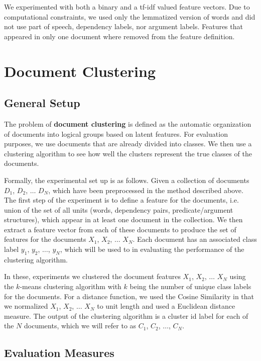 \documentclass[11pt]{article}
\newcommand{\bt}[1]{\textbf{#1}}
\begin{document}
We experimented with both a binary and a tf-idf valued feature vectors. Due to computational constraints, we used only the lemmatized version of words and did not use part of speech, dependency labels, nor argument labels. Features that appeared in only one document where removed from the feature definition.


\section{Document Clustering} \label{sec:DocumentClusterting}

\subsection{General Setup}

The problem of \bt{document clustering} is defined as the automatic organization of documents into logical groups based on latent features. For evaluation purposes, we use documents that are already divided into classes. We then use a clustering algorithm to see how well the clusters represent the true classes of the documents. 

Formally, the experimental set up is as follows. Given a collection of documents $D_1$, $D_2$, $\dots$ $D_N$,  which have been preprocessed in the method described above. The first step of the experiment is to define a feature for the documents, i.e. union of the set of all units (words, dependency pairs, predicate/argument structures), which appear in at least one document in the collection. We then extract a feature vector from each of these documents to produce the set of features for the documents $X_1$, $X_2$, $\dots$ $X_N$. Each document has an associated class label $y_1$, $y_2$, $\dots$, $y_N$, which will be used to in evaluating the performance of the clustering algorithm.

In these, experiments we clustered the document features $X_1$, $X_2$, $\dots$ $X_N$ using the $k$-means clustering algorithm with $k$ being the number of unique class labels for the documents. For a distance function, we used the Cosine Similarity in that we normalized $X_1$, $X_2$, $\dots$ $X_N$  to unit length and used a Euclidean distance measure. The output of the clustering algorithm is a cluster id label for each of the $N$ documents, which we will refer to as $C_1$, $C_2$, $\dots$, $C_N$. 


\subsection{Evaluation Measures}
\end{document}
